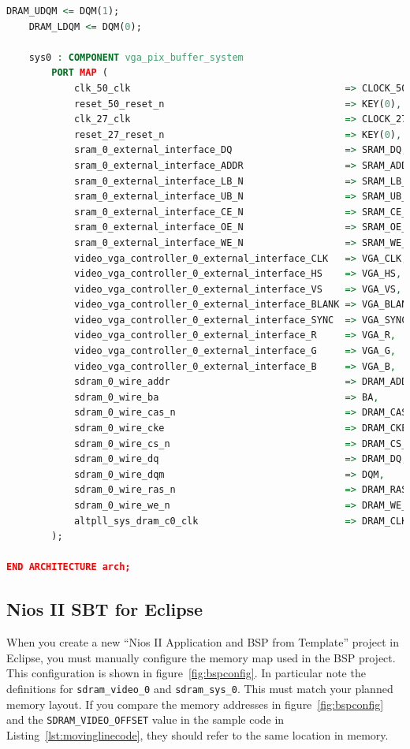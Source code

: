 \documentclass{capstonedoc}
\begin{document}
\begin{lstlisting}[language=vhdl,caption={Sample Top Level VHDL File},label={lst:toplevel},tabsize=1]
	DRAM_UDQM <= DQM(1);
	DRAM_LDQM <= DQM(0);

	sys0 : COMPONENT vga_pix_buffer_system
		PORT MAP (
			clk_50_clk                                      => CLOCK_50,
			reset_50_reset_n                                => KEY(0),
			clk_27_clk                                      => CLOCK_27,
			reset_27_reset_n                                => KEY(0),
			sram_0_external_interface_DQ                    => SRAM_DQ,
			sram_0_external_interface_ADDR                  => SRAM_ADDR,
			sram_0_external_interface_LB_N                  => SRAM_LB_N,
			sram_0_external_interface_UB_N                  => SRAM_UB_N,
			sram_0_external_interface_CE_N                  => SRAM_CE_N,
			sram_0_external_interface_OE_N                  => SRAM_OE_N,
			sram_0_external_interface_WE_N                  => SRAM_WE_N,
			video_vga_controller_0_external_interface_CLK   => VGA_CLK,
			video_vga_controller_0_external_interface_HS    => VGA_HS,
			video_vga_controller_0_external_interface_VS    => VGA_VS,
			video_vga_controller_0_external_interface_BLANK => VGA_BLANK,
			video_vga_controller_0_external_interface_SYNC  => VGA_SYNC,
			video_vga_controller_0_external_interface_R     => VGA_R,
			video_vga_controller_0_external_interface_G     => VGA_G,
			video_vga_controller_0_external_interface_B     => VGA_B,
			sdram_0_wire_addr                               => DRAM_ADDR,
			sdram_0_wire_ba                                 => BA,
			sdram_0_wire_cas_n                              => DRAM_CAS_N,
			sdram_0_wire_cke                                => DRAM_CKE,
			sdram_0_wire_cs_n                               => DRAM_CS_N,
			sdram_0_wire_dq                                 => DRAM_DQ,
			sdram_0_wire_dqm                                => DQM,
			sdram_0_wire_ras_n                              => DRAM_RAS_N,
			sdram_0_wire_we_n                               => DRAM_WE_N,
			altpll_sys_dram_c0_clk                          => DRAM_CLK
		);

END ARCHITECTURE arch;
\end{lstlisting}

\subsection{Nios II SBT for Eclipse}

When you create a new ``Nios II Application and BSP from Template'' project in
Eclipse, you must manually configure the memory map used in the BSP project.
This configuration is shown in figure~\ref{fig:bspconfig}. In particular note
the definitions for \texttt{sdram\_video\_0} and \texttt{sdram\_sys\_0}. This
must match your planned memory layout. If you compare the memory addresses in
figure~\ref{fig:bspconfig} and the \texttt{SDRAM\_VIDEO\_OFFSET} value in the
sample code in Listing~\ref{lst:movinglinecode}, they should refer to the same
location in memory.
\end{document}

